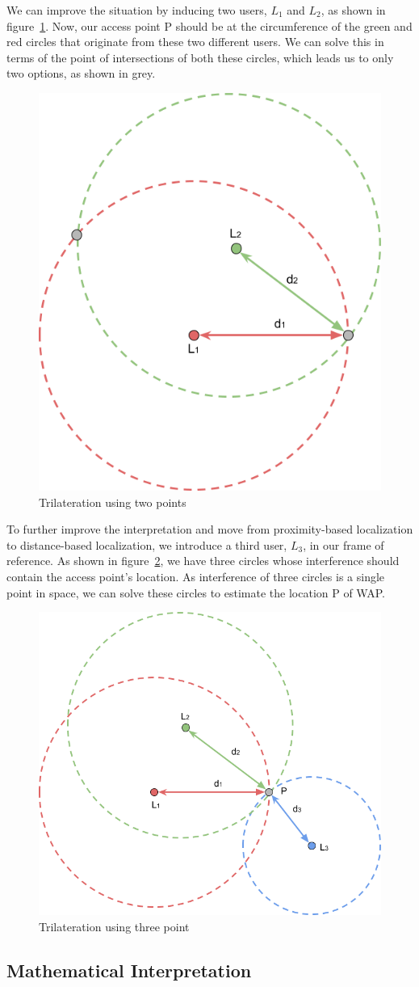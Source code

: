 \documentclass[a4paper,singleside,12pt]{report} %
\begin{document}
				We can improve the situation by inducing two users, $L_1$ and $L_2$, as shown in figure~\ref{fig4.13}. 
				Now, our access point P should be at the circumference of the green and red circles that originate from these two different users. 
				We can solve this in terms of the point of intersections of both these circles, which leads us to only two options, as shown in grey.

				\begin{figure}[htb!]
					\centering
					\includegraphics[width=0.35\linewidth]{./figures/Trilateration2.png}
					\caption{Trilateration using two points}
					 \label{fig4.13}
				\end{figure}
				
				To further improve the interpretation and move from proximity-based localization to distance-based localization, we introduce a third user, $L_3$, in our frame of reference. 
				As shown in figure~\ref{fig4.14}, we have three circles whose interference should contain the access point's location. 
				As interference of three circles is a single point in space, we can solve these circles to estimate the location P of WAP.
				
				\begin{figure}[htb!]
					\centering
					\includegraphics[width=0.35\linewidth]{./figures/Trilateration3.png}
					\caption{Trilateration using three point}
					 \label{fig4.14}
				\end{figure}

			\subsection{Mathematical Interpretation}
\end{document}
